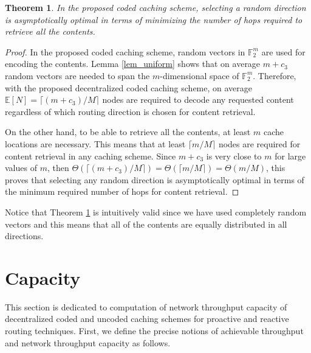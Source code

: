 \documentclass[10pt,journal]{IEEEtran}
\newtheorem{thm}{Theorem}
\begin{document}
\begin{thm}{ \em
 In the proposed coded caching scheme, selecting a random direction is asymptotically optimal in terms of minimizing the number of hops required to retrieve all the contents.
} \label{thm_random_optimal}
\end{thm}
\begin{proof}
 In the proposed coded caching scheme, random vectors in $\mathbb{F}_2^m$ are used for encoding the contents. Lemma \ref{lem_uniform} shows that on average $m + c_3$ random vectors are needed to span the $m$-dimensional space of $\mathbb{F}_2^m$. Therefore, with the proposed decentralized coded caching scheme, on average  $\mathbb{E}[N]=\lceil (m+c_3)/M \rceil $ nodes are required to decode any requested content regardless of which routing direction is chosen for content retrieval. 
 
 On the other hand, to be able to retrieve all the contents, at least $m$ cache locations are necessary. This means that at least $\lceil m/M \rceil $ nodes are required for content retrieval in any caching scheme. Since $m+c_3$ is very close to $m$ for large values of $m$, then $ \Theta(\lceil (m+c_3)/M \rceil ) = \Theta (\lceil m/M \rceil) = \Theta(m/M)$, this proves that selecting any random direction is asymptotically optimal in terms of the minimum required number of hops for content retrieval. 
\end{proof}

Notice that Theorem \ref{thm_random_optimal} is intuitively valid since we have used completely random vectors and this means that all of the contents are equally distributed in all directions.

%
%
\section{Capacity}
\label{capacity_sec}
This section is dedicated to computation of network throughput capacity of decentralized coded and uncoded caching schemes for proactive and reactive routing techniques. First, we define the precise notions of achievable throughput and network throughput capacity as follows. 
\end{document}
